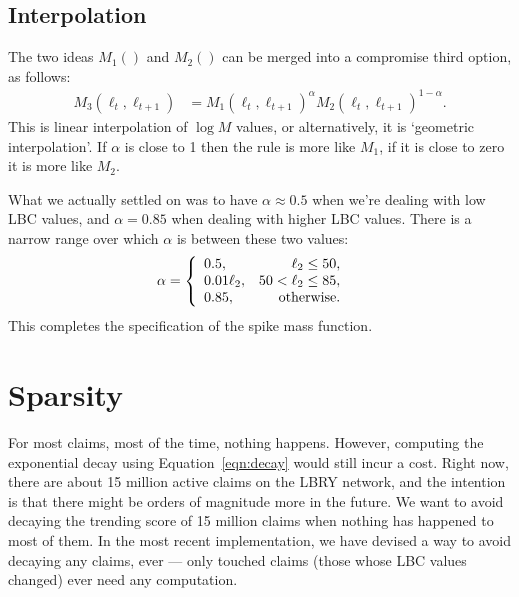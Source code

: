 \documentclass[a4paper, 12pt]{article}
\begin{document}
\subsection{Interpolation}
The two ideas $M_1()$ and $M_2()$ can be merged into a compromise third option,
as follows:
\begin{align}
M_3(\ell_t, \ell_{t+1}) &= M_1(\ell_t, \ell_{t+1})^\alpha
                           M_2(\ell_t, \ell_{t+1})^{1 - \alpha}. \label{eqn:spike_mass}
\end{align}
This is linear interpolation of $\log M$ values, or alternatively, it is
`geometric interpolation'. If $\alpha$ is close to 1 then the rule is more
like $M_1$, if it is close to zero it is more like $M_2$.

What we actually settled on was to have $\alpha \approx 0.5$ when we're dealing
with low LBC values, and $\alpha = 0.85$ when dealing with higher LBC values.
There is a narrow range over which $\alpha$ is between these two values:
\begin{align}
\alpha &= \left\{
        \begin{array}{lr}
            0.5, & \ell_2 \leq 50,\\
            0.01\ell_2, & 50 < \ell_2 \leq 85,\\
            0.85, & \textnormal{otherwise}.
        \end{array}
        \right.
\end{align}
This completes the specification of the spike mass function.



\section{Sparsity}
For most claims, most of the time, nothing happens. However, computing the
exponential decay using Equation~\ref{eqn:decay} would still incur a cost.
Right now, there are about 15 million active claims on the LBRY network,
and the intention is that there might be orders of magnitude more in the
future. We want to avoid decaying the trending score of 15 million claims
when nothing has happened to most of them. In the most recent implementation,
we have devised a way to avoid decaying any claims, ever --- only touched claims
(those whose LBC values changed) ever need any computation.
\end{document}
